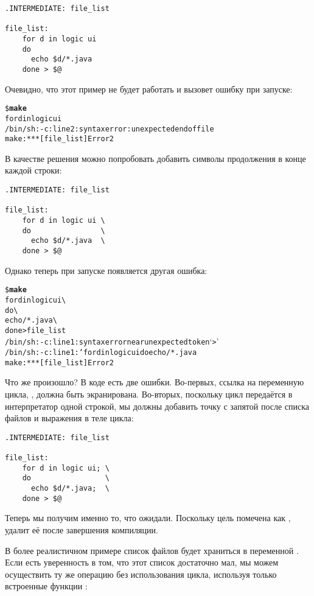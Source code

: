{\footnotesize
\begin{verbatim}
.INTERMEDIATE: file_list

file_list:
    for d in logic ui
    do
      echo $d/*.java
    done > $@
\end{verbatim}
}

Очевидно, что этот пример не будет работать и вызовет ошибку при
запуске:

{\footnotesize
\begin{alltt}
  \${} \textbf{make}
  for d in logic ui
  /bin/sh: -c: line 2: syntax error: unexpected end of file
  make: *** [file\_{}list] Error 2
\end{alltt}
}

В качестве решения можно попробовать добавить символы продолжения в
конце каждой строки:

{\footnotesize
\begin{verbatim}
.INTERMEDIATE: file_list

file_list:
    for d in logic ui \
    do                \
      echo $d/*.java  \
    done > $@
\end{verbatim}
}

Однако теперь при запуске появляется другая ошибка:

{\footnotesize
\begin{alltt}
\${} \textbf{make}
for d in logic ui \textbackslash{}
do                \textbackslash{}
  echo /*.java    \textbackslash{}
done > file\_list
/bin/sh: -c: line 1: syntax error near unexpected token `>'
/bin/sh: -c: line 1: `for d in logic ui do       echo /*.java
make: *** [file\_list] Error 2
\end{alltt}
}

Что же произошло? В коде есть две ошибки. Во-первых, ссылка на
переменную цикла, , должна быть экранирована. Во-вторых,
поскольку цикл передаётся в интерпретатор одной строкой, мы должны
добавить точку с запятой после списка файлов и выражения в теле цикла:

{\footnotesize
\begin{verbatim}
.INTERMEDIATE: file_list

file_list:
    for d in logic ui; \
    do                 \
      echo $d/*.java;  \
    done > $@
\end{verbatim}
}

Теперь мы получим именно то, что ожидали. Поскольку цель
\target{file\_list} помечена как , \GNUmake{}
удалит её после завершения компиляции.

В более реалистичном примере список файлов будет храниться в
переменной \GNUmake{}. Если есть уверенность в том, что этот список
достаточно мал, мы можем осуществить ту же операцию без использования
цикла, используя только встроенные функции \GNUmake{}:

